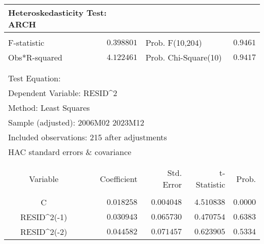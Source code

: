 \begin{tabular}{lrrrr}
\multicolumn{2}{l}{Heteroskedasticity Test: ARCH}&\multicolumn{1}{c}{}&\multicolumn{1}{c}{}&\multicolumn{1}{c}{}\\
[4.5pt] \hline \\ [-4.5pt]
\multicolumn{1}{l}{F-statistic}&\multicolumn{1}{r}{$0.398801$}&\multicolumn{2}{l}{Prob. F(10,204)}&\multicolumn{1}{r}{$0.9461$}\\
\multicolumn{1}{l}{Obs*R-squared}&\multicolumn{1}{r}{$4.122461$}&\multicolumn{2}{l}{Prob. Chi-Square(10)}&\multicolumn{1}{r}{$0.9417$}\\
[4.5pt] \hline \\ [-4.5pt]
\multicolumn{1}{c}{}&\multicolumn{1}{c}{}&\multicolumn{1}{c}{}&\multicolumn{1}{c}{}&\multicolumn{1}{c}{}\\
\multicolumn{1}{l}{Test Equation:}&\multicolumn{1}{c}{}&\multicolumn{1}{c}{}&\multicolumn{1}{c}{}&\multicolumn{1}{c}{}\\
\multicolumn{2}{l}{Dependent Variable: RESID\textasciicircum 2}&\multicolumn{1}{c}{}&\multicolumn{1}{c}{}&\multicolumn{1}{c}{}\\
\multicolumn{2}{l}{Method: Least Squares}&\multicolumn{1}{c}{}&\multicolumn{1}{c}{}&\multicolumn{1}{c}{}\\
\multicolumn{3}{l}{Sample (adjusted): 2006M02 2023M12}&\multicolumn{1}{c}{}&\multicolumn{1}{c}{}\\
\multicolumn{4}{l}{Included observations: 215 after adjustments}&\multicolumn{1}{c}{}\\
\multicolumn{6}{l}{HAC standard errors \& covariance}\\
{}&\multicolumn{1}{c}{}&\multicolumn{1}{c}{}\\
[4.5pt] \hline \\ [-4.5pt]
\multicolumn{1}{c}{Variable}&\multicolumn{1}{r}{Coefficient}&\multicolumn{1}{r}{Std. Error}&\multicolumn{1}{r}{t-Statistic}&\multicolumn{1}{r}{Prob.}\\
[4.5pt] \hline \\ [-4.5pt]
\multicolumn{1}{c}{C}&\multicolumn{1}{r}{$0.018258$}&\multicolumn{1}{r}{$0.004048$}&\multicolumn{1}{r}{$4.510838$}&\multicolumn{1}{r}{$0.0000$}\\
\multicolumn{1}{c}{RESID\textasciicircum 2(-1)}&\multicolumn{1}{r}{$0.030943$}&\multicolumn{1}{r}{$0.065730$}&\multicolumn{1}{r}{$0.470754$}&\multicolumn{1}{r}{$0.6383$}\\
\multicolumn{1}{c}{RESID\textasciicircum 2(-2)}&\multicolumn{1}{r}{$0.044582$}&\multicolumn{1}{r}{$0.071457$}&\multicolumn{1}{r}{$0.623905$}&\multicolumn{1}{r}{$0.5334$}\\

\end{tabular}
